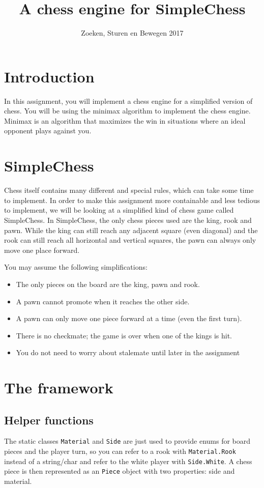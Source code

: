 \documentclass{article}
\title{A chess engine for SimpleChess}
\author{Zoeken, Sturen en Bewegen 2017}
\date{}
\begin{document}
\maketitle

\section*{Introduction}
In this assignment, you will implement a chess engine for a simplified version of chess. You will be using the minimax algorithm to implement the chess engine. Minimax is an algorithm that maximizes the win in situations where an ideal opponent plays against you.  

\section*{SimpleChess}
Chess itself contains many different and special rules, which can take some time to implement. In order to make this assignment more containable and less tedious to implement, we will be looking at a simplified kind of chess game called SimpleChess. In SimpleChess, the only chess pieces used are the king, rook and pawn. While the king can still reach any adjacent square (even diagonal) and the rook can still reach all horizontal and vertical squares, the pawn can always only move one place forward.

You may assume the following simplifications:
\begin{itemize}
    \item The only pieces on the board are the king, pawn and rook.
    \item A pawn cannot promote when it reaches the other side.
    \item A pawn can only move one piece forward at a time (even the first turn).
    \item There is no checkmate; the game is over when one of the kings is hit.
    \item You do not need to worry about stalemate until later in the assignment
\end{itemize}

\section*{The framework}
\subsection*{Helper functions}
The static classes \texttt{Material} and \texttt{Side} are just used to provide enums for board pieces and the player turn, so you can refer to a rook with \texttt{Material.Rook} instead of a string/char and refer to the white player with \texttt{Side.White}. A chess piece is then represented as an \texttt{Piece} object with two properties: side and material.
\end{document}
